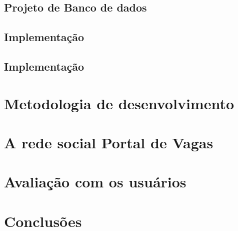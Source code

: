 \documentclass[cic,tc]{iiufrgs}
\begin{document}
\section{Projeto de Banco de dados}
\label{metodologiaProjetoBD}

\section{Implementação}
\label{metodologiaImplementação}

\section{Implementação}
\label{metodologiaImplementação}

\chapter{Metodologia de desenvolvimento}
\label{cap_baseline}

\chapter{A rede social Portal de Vagas}
\label{cap_baseline}

\chapter{Avaliação com os usuários}
\label{cap_baseline}

\chapter{Conclusões}
\label{conclusao}
\end{document}

